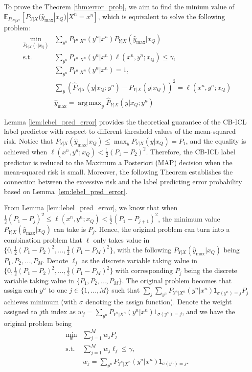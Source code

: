 \documentclass{article} %
\DeclareMathOperator*{\argmax}{arg\,max}
\theoremstyle{plain} %
\begin{document}
To prove the Theorem \ref{thm:error_prob}, we aim to find the minium value of $\mathbb{E}_{P_{Y^n|X^n}}[P_{Y|X}(\hat{y}_{\max} |x_Q)|X^n=x^n]$, which is equivalent to solve the following problem:
\begin{align*}
\min_{\hat{P}_{Y|X}(\cdot|x_Q)} & \sum_{y^n}P_{Y^n|X^n}(y^n|x^n) P_{Y|X}(\hat{y}_{\max}|x_Q)\\
\text{s.t.}& \sum_{y^n} P_{Y^n|X^n}(y^n|x^n) \ell(x^n,y^n;x_Q) \leq \gamma,\\
& \sum_{y^n} P_{Y^n|X^n}(y^n|x^n) = 1,\\
& \sum_y (\hat{P}_{Y|X}(y|x_Q;y^n) - P_{Y|X}(y|x_Q))^2 = \ell(x^n,y^n;x_Q)\\
& \hat{y}_{\max} = \argmax_y \hat{P}_{Y|X}(y|x_Q;y^n)
\end{align*}

Lemma \ref{lem:lebel_pred_error} provides the theoretical guarantee of the CB-ICL label predictor with respect to different threshold values of the mean-squared risk. Notice that $P_{Y|X}(\hat{y}_{\max}|x_Q) \leq \max_y P_{Y|X}(y|x_Q) = P_1$, and the equality is achieved when $\ell(x^n,y^n;x_Q) < \frac12 \left( P_1 - P_{2}\right)^2$. Therefore, the CB-ICL label predictor is reduced to the Maximum a Posteriori (MAP) decision when the mean-squared risk is small. Moreover, the following Theorem establishes the connection between the excessive risk and the label predicting error probability based on Lemma \ref{lem:lebel_pred_error}.

From Lemma \ref{lem:lebel_pred_error}, we know that when $\frac12 (P_1-P_{j})^2 \leq \ell(x^n,y^n;x_Q)< \frac12 (P_1-P_{j+1})^2$, the minimum value $P_{Y|X}(\hat{y}_{\max}|x_Q)$ can take is $P_j$. Hence, the original problem can turn into a combination problem that $\ell$ only takes value in $\{0,\frac12 (P_1-P_2)^2,\dots,\frac12(P_1-P_M)^2\}$, with the following $P_{Y|X}(\hat{y}_{\max}|x_Q)$ being $P_1, P_2, \dots,P_M$. Denote $\ell_j$ as the discrete variable taking value in $\{0, \frac12 (P_1-P_2)^2,\dots,\frac12(P_1-P_M)^2\}$ with corresponding ${P}_j$ being the discrete variable taking value in $\{P_1, P_2,\dots,P_M\}$. The original problem becomes that assign each $y^n$ to one $j\in\{1,\dots,M\}$ such that $\sum_j\sum_{y^n} P_{Y^n|X^n}(y^n|x^n)  \mathsf{1}_{\sigma(y^n)=j}P_j$ achieves minimum (with $\sigma$ denoting the assign function). Denote the weight assigned to $j$th index as $w_j = \sum_{y^n} P_{Y^n|X^n}(y^n|x^n)  \mathsf{1}_{\sigma(y^n)=j}$, and we have the original problem being
\begin{align*}\label{prob:assign}
\min_{w} & \sum_{j=1}^M  w_j {P}_{j}  \tag*{(P1)}\\
\text{s.t.}& \sum_{j=1}^M w_j\ell_{j} \leq \gamma,\\
& w_j = \sum_{y^n} P_{Y^n|X^n}(y^n|x^n)  \mathsf{1}_{\sigma(y^n)=j}.
\end{align*}
\end{document}
